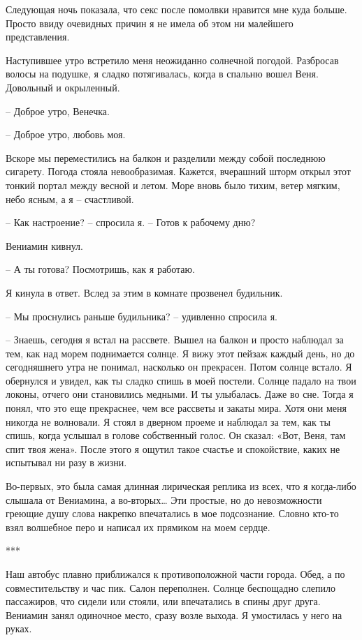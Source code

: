 \documentclass[
]{book}
\begin{document}
Следующая ночь показала, что секс после помолвки нравится мне куда больше. Просто ввиду очевидных причин я не имела об этом ни малейшего представления.

Наступившее утро встретило меня неожиданно солнечной погодой. Разбросав волосы на подушке, я сладко потягивалась, когда в спальню вошел Веня. Довольный и окрыленный.

-- Доброе утро, Венечка.

-- Доброе утро, любовь моя.

Вскоре мы переместились на балкон и разделили между собой последнюю сигарету. Погода стояла невообразимая. Кажется, вчерашний шторм открыл этот тонкий портал между весной и летом. Море вновь было тихим, ветер мягким, небо ясным, а я -- счастливой.

-- Как настроение? -- спросила я. -- Готов к рабочему дню?

Вениамин кивнул.

-- А ты готова? Посмотришь, как я работаю.

Я кинула в ответ. Вслед за этим в комнате прозвенел будильник.

-- Мы проснулись раньше будильника? -- удивленно спросила я.

-- Знаешь, сегодня я встал на рассвете. Вышел на балкон и просто наблюдал за тем, как над морем поднимается солнце. Я вижу этот пейзаж каждый день, но до сегодняшнего утра не понимал, насколько он прекрасен. Потом солнце встало. Я обернулся и увидел, как ты сладко спишь в моей постели. Солнце падало на твои локоны, отчего они становились медными. И ты улыбалась. Даже во сне. Тогда я понял, что это еще прекраснее, чем все рассветы и закаты мира. Хотя они меня никогда не волновали. Я стоял в дверном проеме и наблюдал за тем, как ты спишь, когда услышал в голове собственный голос. Он сказал: «Вот, Веня, там спит твоя жена». После этого я ощутил такое счастье и спокойствие, каких не испытывал ни разу в жизни.

Во-первых, это была самая длинная лирическая реплика из всех, что я когда-либо слышала от Вениамина, а во-вторых\ldots{} Эти простые, но до невозможности греющие душу слова накрепко впечатались в мое подсознание. Словно кто-то взял волшебное перо и написал их прямиком на моем сердце.

***

Наш автобус плавно приближался к противоположной части города. Обед, а по совместительству и час пик. Салон переполнен. Солнце беспощадно слепило пассажиров, что сидели или стояли, или впечатались в спины друг друга. Вениамин занял одиночное место, сразу возле выхода. Я умостилась у него на руках.
\end{document}
